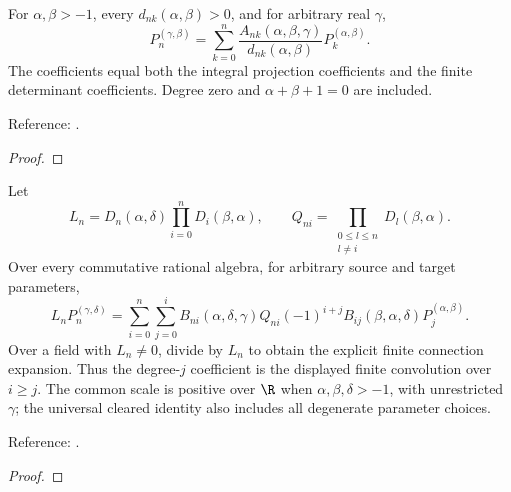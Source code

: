 \begin{theorem}
\label{thm:jacobi-alpha-connection}
\leanok
For $\alpha,\beta>-1$, every $d_{nk}(\alpha,\beta)>0$, and for arbitrary real $\gamma$,
\[ P_n^{(\gamma,\beta)}=
 \sum_{k=0}^n \frac{A_{nk}(\alpha,\beta,\gamma)}{d_{nk}(\alpha,\beta)}P_k^{(\alpha,\beta)}. \]
The coefficients equal both the integral projection coefficients and the finite
determinant coefficients. Degree zero and $\alpha+\beta+1=0$ are included.

Reference: \cite[18.18.14]{dlmf}.
\end{theorem}
\begin{proof}
\leanok
\end{proof}

\begin{theorem}
\label{thm:jacobi-connections}\leanok
{}
Let
\[ L_n=D_n(\alpha,\delta)\prod_{i=0}^nD_i(\beta,\alpha),\qquad
 Q_{ni}=\prod_{\substack{0\le l\le n\\l\ne i}}D_l(\beta,\alpha). \]
Over every commutative rational algebra, for arbitrary source and target parameters,
\[ L_nP_n^{(\gamma,\delta)}=
 \sum_{i=0}^n\sum_{j=0}^i
 B_{ni}(\alpha,\delta,\gamma)Q_{ni}(-1)^{i+j}
 B_{ij}(\beta,\alpha,\delta)P_j^{(\alpha,\beta)}. \]
Over a field with $L_n\ne0$, divide by $L_n$ to obtain the explicit finite
connection expansion. Thus the degree-$j$ coefficient is the displayed finite
convolution over $i\ge j$. The common scale is positive over $\R$ when
$\alpha,\beta,\delta>-1$, with unrestricted $\gamma$; the universal cleared
identity also includes all degenerate parameter choices.

Reference: \cite[18.9(ii) and 18.18(iv)]{dlmf}.
\end{theorem}
\begin{proof}
\leanok
\end{proof}

